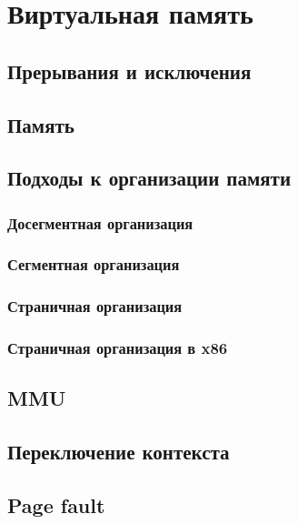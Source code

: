 \documentclass[../../lectures.tex]{subfiles}
\begin{document}
\chapter{Виртуальная память}

\section{Прерывания и исключения}
\todo{}

\section{Память}
\todo{}

\section{Подходы к организации памяти}
\todo{}
\subsection{Досегментная организация}
\subsection{Сегментная организация}
\subsection{Страничная организация}
\subsection{Страничная организация в x86}

\section{MMU}
\todo{}

\section{Переключение контекста}
\todo{}

\section{Page fault}
\end{document}
